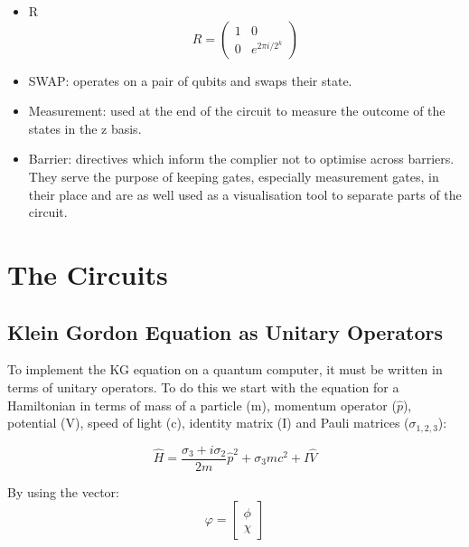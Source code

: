 \documentclass{article}
\begin{document}
\begin{itemize}[labelindent=1.5em,labelsep=0.9cm,leftmargin=*]
	\item R
	\[R = \left(\begin{array}{cc}{1} & {0} \\ {0} & {e^{2 \pi i / 2^{k}}}\end{array}\right)\]
	\item{} {} {} {} {}  SWAP: operates on a pair of qubits and swaps their state.
    \item{} {} {} {} {} Measurement: used at the end of the circuit to measure the outcome of the states in the z basis.
    \item{} {} {} {} {} Barrier: directives which inform the complier not to optimise across barriers. They serve the purpose of keeping gates, especially measurement gates, in their place and are as well used as a visualisation tool to separate parts of the circuit.
\end{itemize}


\section{The Circuits}
\subsection{Klein Gordon Equation as Unitary Operators}
To implement the KG equation on a quantum computer, it must be written in terms of unitary operators. To do this we start with the equation for a Hamiltonian in terms of mass of a particle (m), momentum operator ($\hat{p}$), potential (V), speed of light (c), identity matrix (I) and Pauli matrices ($\sigma_{1,2,3}$):

\begin{equation}
\hat{H}=\frac{\sigma_{3}+i \sigma_{2}}{2 m} \hat{p}^{2}+\sigma_{3} m c^{2}+I \hat{V}
\end{equation}

\noindent By using the vector: 
\[\varphi=\left[\begin{array}{l}{\phi} \\ {\chi}\end{array}\right]\]
\end{document}
